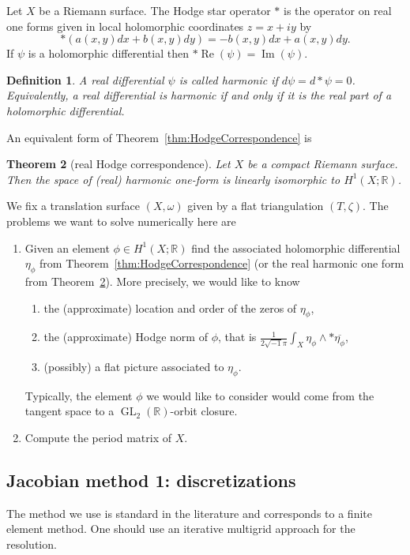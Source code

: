 \documentclass[a4paper,12pt]{article}
\def\bR{\mathbb{R}}
\def\Re{\operatorname{Re}}
\def\Im{\operatorname{Im}}
\def\GL{\operatorname{GL}}
\newtheorem{definition}{Definition}
\newtheorem{theorem}[definition]{Theorem}
\begin{document}
Let $X$ be a Riemann surface. The Hodge star operator $*$ is the operator on 
real one forms given in local holomorphic coordinates $z = x+iy$ by
\[
*(a(x,y) dx + b(x,y) dy) = -b(x,y) dx + a(x,y) dy.
\]
If $\psi$ is a holomorphic differential then $* \Re(\psi) = \Im(\psi)$.

\begin{definition}
A real differential $\psi$ is called \emph{harmonic} if $d \psi = d*\psi = 0$.
Equivalently, a real differential is harmonic if and only if it is the real
part of a holomorphic differential.
\end{definition}

An equivalent form of Theorem~\ref{thm:HodgeCorrespondence} is
\begin{theorem}[real Hodge correspondence]
\label{thm:realHodgeCorrespondence}
Let $X$ be a compact Riemann surface. Then the space of (real) harmonic one-form
is linearly isomorphic to $H^1(X; \bR)$.
\end{theorem}

We fix a translation surface $(X, \omega)$ given by a flat triangulation $(T,\zeta)$.
The problems we want to solve numerically here are
\begin{enumerate}
\item Given an element $\phi \in H^1(X; \bR)$ find the associated holomorphic differential
$\eta_\phi$ from Theorem~\ref{thm:HodgeCorrespondence} (or the real harmonic one form from Theorem~\ref{thm:realHodgeCorrespondence}).
More precisely, we would like to know
\begin{enumerate}
\item the (approximate) location and order of the zeros of $\eta_\phi$,
\item the (approximate) Hodge norm of $\phi$, that is $\frac{1}{2 \sqrt{-1} \pi} \int_X \eta_\phi \wedge * \overline{\eta_\phi}$,
\item (possibly) a flat picture associated to $\eta_\phi$.
\end{enumerate}
Typically, the element $\phi$ we would like to consider would come from the tangent
space to a $\GL_2(\bR)$-orbit closure.
\item Compute the period matrix of $X$.
\end{enumerate}

\subsection{Jacobian method 1: discretizations}
The method we use is standard in the literature and corresponds to a finite element
method. One should use an iterative multigrid approach for the resolution.
\end{document}
